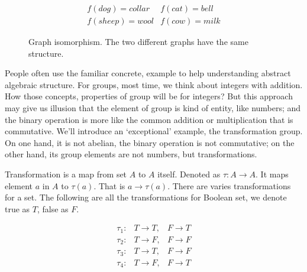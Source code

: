 \documentclass[b5paper]{article}
\begin{document}
\begin{figure}[htbp]
\centering
{}
\[
\begin{array}{rl}
f(dog) = collar & f(cat) = bell \\
f(sheep) = wool & f(cow) = milk
\end{array}
\]
\caption{Graph isomorphism. The two different graphs have the same structure.}
\label{fig:graph-isomorphism}
\end{figure}

People often use the familiar concrete, example to help understanding abstract algebraic structure. For groups, most time, we think about integers with addition. How those concepts, properties of group will be for integers? But this approach may give us illusion that the element of group is kind of entity, like numbers; and the binary operation is more like the common addition or multiplication that is commutative. We'll introduce an `exceptional' example, the transformation group. On one hand, it is not abelian, the binary operation is not commutative; on the other hand, its group elements are not numbers, but transformations.

Transformation is a map from set $A$ to $A$ itself. Denoted as $\tau : A \to A$. It maps element $a$ in $A$ to $\tau(a)$. That is $a \to \tau(a)$. There are varies transformations for a set. The following are all the transformations for Boolean set, we denote true as $T$, false as $F$.

\[
\begin{array}{rll}
\tau_1 : & T \to T, & F \to T \\
\tau_2 : & T \to F, & F \to F \\
\tau_3 : & T \to T, & F \to F \\
\tau_4 : & T \to F, & F \to T
\end{array}
\]
\end{document}
